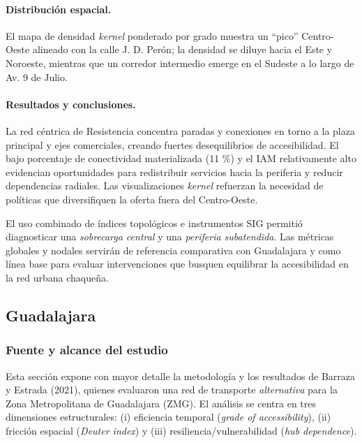 \documentclass[11pt]{article}
\begin{document}
		\paragraph{Distribución espacial.}
		El mapa de densidad \emph{kernel} ponderado por grado muestra un “pico” Centro-Oeste alineado con la calle J. D. Perón; la densidad se diluye hacia el Este y Noroeste, mientras que un corredor intermedio emerge en el Sudeste a lo largo de Av. 9 de Julio.

		\paragraph{Resultados y conclusiones.}
		La red céntrica de Resistencia concentra paradas y conexiones en torno a la plaza principal y ejes comerciales, creando fuertes desequilibrios de accesibilidad. El bajo porcentaje de conectividad materializada (11 \%) y el IAM relativamente alto evidencian oportunidades para redistribuir servicios hacia la periferia y reducir dependencias radiales. Las visualizaciones \emph{kernel} refuerzan la necesidad de políticas que diversifiquen la oferta fuera del Centro-Oeste.

		\bigskip

		El uso combinado de índices topológicos e instrumentos SIG permitió diagnosticar una \emph{sobrecarga central} y una \emph{periferia subatendida}. Las métricas globales y nodales servirán de referencia comparativa con Guadalajara y como línea base para evaluar intervenciones que busquen equilibrar la accesibilidad en la red urbana chaqueña.

	\subsection{Guadalajara}
		\label{sec:guadalajara}

		\subsubsection*{Fuente y alcance del estudio}
		Esta sección expone con mayor detalle la metodología y los resultados de Barraza y Estrada (2021), quienes evaluaron una red de transporte \emph{alternativa} para la Zona Metropolitana de Guadalajara (ZMG). El análisis se centra en tres dimensiones estructurales: (i) eficiencia temporal (\textit{grade of accessibility}), (ii) fricción espacial (\textit{Deuter index}) y (iii) resiliencia/vulnerabilidad (\textit{hub dependence}).
\end{document}
